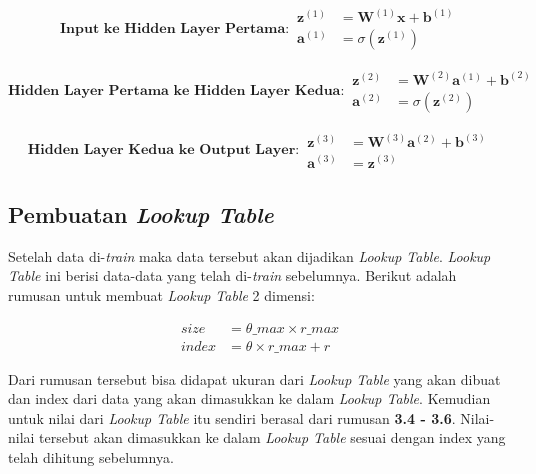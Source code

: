 \begin{equation}
  \textbf{Input ke Hidden Layer Pertama}:
  \begin{aligned}
    \mathbf{z}^{(1)} &= \mathbf{W}^{(1)} \mathbf{x} + \mathbf{b}^{(1)} \\
    \mathbf{a}^{(1)} &= \sigma(\mathbf{z}^{(1)})
  \end{aligned}
\end{equation}

\begin{equation}
  \textbf{Hidden Layer Pertama ke Hidden Layer Kedua}:
  \begin{aligned}
    \mathbf{z}^{(2)} &= \mathbf{W}^{(2)} \mathbf{a}^{(1)} + \mathbf{b}^{(2)} \\
    \mathbf{a}^{(2)} &= \sigma(\mathbf{z}^{(2)})
  \end{aligned}
\end{equation}

\begin{equation}
  \textbf{Hidden Layer Kedua ke Output Layer}:
  \begin{aligned}
    \mathbf{z}^{(3)} &= \mathbf{W}^{(3)} \mathbf{a}^{(2)} + \mathbf{b}^{(3)} \\
    \mathbf{a}^{(3)} &= \mathbf{z}^{(3)}
  \end{aligned}
\end{equation}

\subsection{Pembuatan \textit{Lookup Table}
  \label{sec:pembuatanlut}}

Setelah data di-\textit{train} maka data tersebut akan dijadikan \textit{Lookup Table}. \textit{Lookup Table} ini berisi data-data yang telah di-\textit{train} sebelumnya. Berikut adalah rumusan untuk membuat \textit{Lookup Table} 2 dimensi: 

\begin{equation}
  \begin{aligned}
    size &= \theta\_max \times r\_max \\
    index &= \theta \times r\_max + r
  \end{aligned}
\end{equation}

Dari rumusan tersebut bisa didapat ukuran dari \textit{Lookup Table} yang akan dibuat dan index dari data yang akan dimasukkan ke dalam \textit{Lookup Table}.
Kemudian untuk nilai dari \textit{Lookup Table} itu sendiri berasal dari rumusan \textbf{3.4 - 3.6}. Nilai-nilai tersebut akan dimasukkan ke dalam \textit{Lookup Table} sesuai dengan index yang telah dihitung sebelumnya. 

